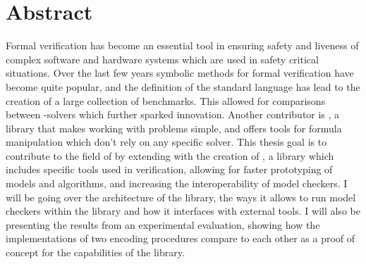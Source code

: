 \chapter*{Abstract}
\label{abstract}


Formal verification has become an essential tool in ensuring safety and liveness of complex software and hardware systems which are used in safety critical situations.
Over the last few years symbolic methods for formal verification have become quite popular, and the definition of the standard language \smtlib{} has lead to the creation of a large collection of benchmarks.
This allowed for comparisons between \smt{}-solvers which further sparked innovation.
Another contributor is \pysmt{}, a \python{} library that makes working with \smt{} problems simple, and offers tools for formula manipulation which don't rely on any specific solver.
This thesis goal is to contribute to the field of \VMT{} by extending \pysmt{} with the creation of \pyvmt{}, a library which includes specific tools used in verification, allowing for faster prototyping of models and algorithms, and increasing the interoperability of model checkers.
I will be going over the architecture of the library, the ways it allows to run model checkers within the library and how it interfaces with external tools.
I will also be presenting the results from an experimental evaluation, showing how the implementations of two \ltl{} encoding procedures compare to each other as a proof of concept for the capabilities of the library.

